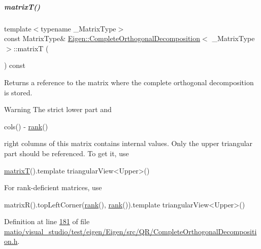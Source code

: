 \mbox{\label{group___q_r___module_a806213f5c96ff765265f47067229586d}} 
\subparagraph{\texorpdfstring{matrix\+T()}{matrixT()}\hspace{0.1cm}{\footnotesize\ttfamily [1/2]}}
{\footnotesize\ttfamily template$<$typename \+\_\+\+Matrix\+Type$>$ \\
const Matrix\+Type\& \hyperlink{group___q_r___module_class_eigen_1_1_complete_orthogonal_decomposition}{Eigen\+::\+Complete\+Orthogonal\+Decomposition}$<$ \+\_\+\+Matrix\+Type $>$\+::matrixT (\begin{DoxyParamCaption}{ }\end{DoxyParamCaption}) const\hspace{0.3cm}{\ttfamily [inline]}}

\begin{DoxyReturn}{Returns}
a reference to the matrix where the complete orthogonal decomposition is stored. 
\end{DoxyReturn}
\begin{DoxyWarning}{Warning}
The strict lower part and
\begin{DoxyCode}
cols() - \hyperlink{group___q_r___module_af348f64b26f8467a020062c22b748806}{rank}() 
\end{DoxyCode}
 right columns of this matrix contains internal values. Only the upper triangular part should be referenced. To get it, use 
\begin{DoxyCode}
\hyperlink{group___q_r___module_a806213f5c96ff765265f47067229586d}{matrixT}().template triangularView<Upper>() 
\end{DoxyCode}
 For rank-\/deficient matrices, use 
\begin{DoxyCode}
matrixR().topLeftCorner(\hyperlink{group___q_r___module_af348f64b26f8467a020062c22b748806}{rank}(), \hyperlink{group___q_r___module_af348f64b26f8467a020062c22b748806}{rank}()).template triangularView<Upper>()
\end{DoxyCode}
 
\end{DoxyWarning}


Definition at line \hyperlink{matio_2visual__studio_2test_2eigen_2_eigen_2src_2_q_r_2_complete_orthogonal_decomposition_8h_source_l00181}{181} of file \hyperlink{matio_2visual__studio_2test_2eigen_2_eigen_2src_2_q_r_2_complete_orthogonal_decomposition_8h_source}{matio/visual\+\_\+studio/test/eigen/\+Eigen/src/\+Q\+R/\+Complete\+Orthogonal\+Decomposition.\+h}.

